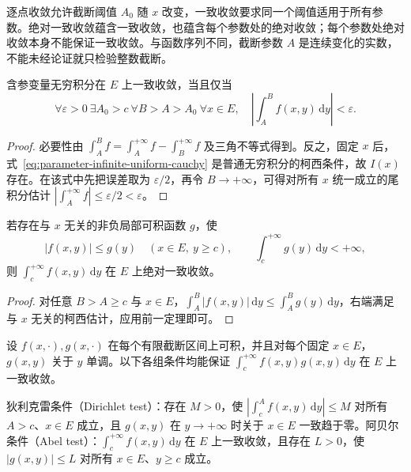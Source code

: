 \documentclass[UTF8,12pt,a4paper,fontset=fandol]{ctexbook}
\begin{document}
逐点收敛允许截断阈值 $A_0$ 随 $x$ 改变，一致收敛要求同一个阈值适用于所有参数。绝对一致收敛蕴含一致收敛，也蕴含每个参数处的绝对收敛；每个参数处绝对收敛本身不能保证一致收敛。与函数序列不同，截断参数 $A$ 是连续变化的实数，不能未经论证就只检验整数截断。

\begin{theorem}[一致收敛的柯西准则]
\label{thm:parameter-infinite-uniform-cauchy}
含参变量无穷积分在 $E$ 上一致收敛，当且仅当
\begin{equation}
    \forall\varepsilon>0\ \exists A_0>c\ \forall B>A>A_0\ \forall x\in E,
    \quad\left|\int_A^B f(x,y)\,\mathrm{d}y\right|<\varepsilon.
    \label{eq:parameter-infinite-uniform-cauchy}
\end{equation}
\end{theorem}

\begin{proof}
必要性由 $\int_A^B f=\int_A^{+\infty}f-\int_B^{+\infty}f$ 及三角不等式得到。反之，固定 $x$ 后，式~\eqref{eq:parameter-infinite-uniform-cauchy} 是普通无穷积分的柯西条件，故 $I(x)$ 存在。在该式中先把误差取为 $\varepsilon/2$，再令 $B\to+\infty$，可得对所有 $x$ 统一成立的尾积分估计 $|\int_A^{+\infty}f|\leq\varepsilon/2<\varepsilon$。
\end{proof}

\begin{theorem}[魏尔斯特拉斯判别法]
\label{thm:parameter-infinite-weierstrass}
若存在与 $x$ 无关的非负局部可积函数 $g$，使
\[
    |f(x,y)|\leq g(y)\quad(x\in E,\ y\geq c),\qquad
    \int_c^{+\infty}g(y)\,\mathrm{d}y<+\infty,
\]
则 $\int_c^{+\infty}f(x,y)\,\mathrm{d}y$ 在 $E$ 上绝对一致收敛。
\end{theorem}

\begin{proof}
对任意 $B>A\geq c$ 与 $x\in E$，$\int_A^B|f(x,y)|\,\mathrm{d}y\leq\int_A^B g(y)\,\mathrm{d}y$，右端满足与 $x$ 无关的柯西估计，应用前一定理即可。
\end{proof}

\begin{theorem}[狄利克雷与阿贝尔判别法]
\label{thm:parameter-infinite-dirichlet-abel}
设 $f(x,\cdot),g(x,\cdot)$ 在每个有限截断区间上可积，并且对每个固定 $x\in E$，$g(x,y)$ 关于 $y$ 单调。以下各组条件均能保证 $\int_c^{+\infty}f(x,y)g(x,y)\,\mathrm{d}y$ 在 $E$ 上一致收敛。

狄利克雷条件（Dirichlet test）：存在 $M>0$，使 $|\int_c^A f(x,y)\,\mathrm{d}y|\leq M$ 对所有 $A>c$、$x\in E$ 成立，且 $g(x,y)$ 在 $y\to+\infty$ 时关于 $x\in E$ 一致趋于零。阿贝尔条件（Abel test）：$\int_c^{+\infty}f(x,y)\,\mathrm{d}y$ 在 $E$ 上一致收敛，且存在 $L>0$，使 $|g(x,y)|\leq L$ 对所有 $x\in E$、$y\geq c$ 成立。
\end{theorem}
\end{document}
